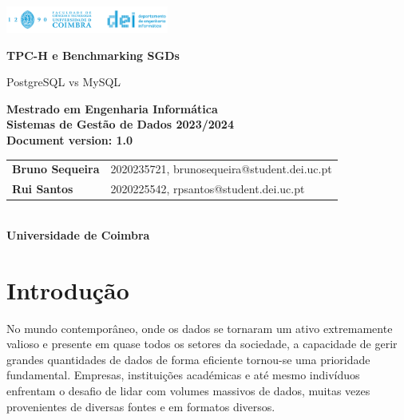 \documentclass{article}
\begin{document}
\begin{titlepage}
    \centering
    \vspace*{1cm}

    \includegraphics[width=0.4\textwidth]{dei_thumb.png} %

    \vspace{1.5cm}
    {\LARGE \textbf{TPC-H e Benchmarking SGDs} \par}
   
    {\Large PostgreSQL vs MySQL \par}

    \vspace{2.5cm}
    \textbf{Mestrado em Engenharia Informática} \\
    \textbf{Sistemas de Gestão de Dados 2023/2024} \\
    \vspace{0.5cm} 
    \textbf{Document version: 1.0} \\
    \vspace{3cm}
    \begin{tabular}{ll}
        \textbf{Bruno Sequeira} & 2020235721, brunosequeira@student.dei.uc.pt \\
        \textbf{Rui Santos} & 2020225542, rpsantos@student.dei.uc.pt
        
      
    \end{tabular}\\
    \vspace{1.5cm} 
    \textbf{Universidade de Coimbra}

    \date{}

    \vfill

\end{titlepage}
   \clearpage
   \tableofcontents
   \clearpage
   \listoffigures
   \listoftables

\clearpage
\section{Introdução}
\texttt{}\par No mundo contemporâneo, onde os dados se tornaram um ativo extremamente valioso e presente em quase todos os setores da sociedade, a capacidade de gerir grandes quantidades de dados de forma eficiente tornou-se uma prioridade fundamental. Empresas, instituições académicas e até mesmo indivíduos enfrentam o desafio de lidar com volumes massivos de dados, muitas vezes provenientes de diversas fontes e em formatos diversos.\\
\end{document}
